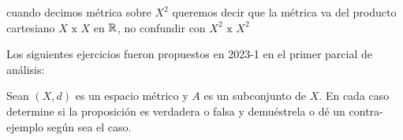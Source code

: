 \begin{itemize}[leftmargin=*]
   \begin{note}
   cuando decimos métrica sobre $X^2$ queremos decir que la métrica va del producto cartesiano $X \text{ x } X$ en $\mathbb{R}$, no confundir con $X^2 \text{ x } X^2$ 
   \end{note}
   


\begin{note}
Los siguientes ejercicios fueron propuestos en 2023-1 en el primer parcial de análisis:
\end{note}

\end{itemize}


Sean $(X, d)$ es un espacio métrico y $A$ es un subconjunto de $X$. En cada caso determine si la proposición es verdadera o falsa y demuéstrela o dé un contra-ejemplo según sea el caso.

